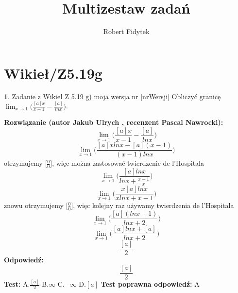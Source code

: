 \documentclass[12pt, a4paper]{article}
\title{Multizestaw zadań}
\author{Robert Fidytek}
\date{}
\theoremstyle{definition} %
\newtheorem{zad}{}
\newcommand{\kategoria}[1]{\section{#1}} %
\newcommand{\zadStart}[1]{\begin{zad}#1\newline} %
\newcommand{\zadStop}{\end{zad}}   %
\newcommand{\rozwStart}[2]{\noindent \textbf{Rozwiązanie (autor #1 , recenzent #2): }\newline} %
\newcommand{\rozwStop}{\newline}                                            %
\newcommand{\odpStart}{\noindent \textbf{Odpowiedź:}\newline}    %
\newcommand{\odpStop}{\newline}                                             %
\newcommand{\testStart}{\noindent \textbf{Test:}\newline} %
\newcommand{\testStop}{\newline} %
\newcommand{\kluczStart}{\noindent \textbf{Test poprawna odpowiedź:}\newline} %
\newcommand{\kluczStop}{\newline} %
\begin{document}
\maketitle


\kategoria{Wikieł/Z5.19g}
\zadStart{Zadanie z Wikieł Z 5.19 g) moja wersja nr [nrWersji]}
Obliczyć granicę $\lim_{x \to 1}\big(\frac{[a]x}{x-1}-\frac{[a]}{lnx}\big)$.
\zadStop
\rozwStart{Jakub Ulrych}{Pascal Nawrocki}
$$\lim_{x \to 1}\big(\frac{[a]x}{x-1}-\frac{[a]}{lnx}\big)$$
$$\lim_{x \to 1}\big(\frac{[a]xlnx-[a](x-1)}{(x-1)lnx}\big)$$
otrzymujemy $\big[\frac{0}{0}\big]$, więc można zastosować twierdzenie de l'Hospitala
$$\lim_{x \to 1}\big(\frac{[a]lnx}{lnx+\frac{x-1}{x}}\big)$$
$$\lim_{x \to 1}\big(\frac{x[a]lnx}{xlnx+x-1}\big)$$
znowu otrzymujemy $\big[\frac{0}{0}\big]$, więc kolejny raz używamy twierdzenia de l'Hospitala
$$\lim_{x \to 1}\big(\frac{[a](lnx+1)}{lnx+2}\big)$$
$$\lim_{x \to 1}\big(\frac{[a]lnx+[a]}{lnx+2}\big)$$
$$\frac{[a]}{2}$$
\rozwStop
\odpStart
$$\frac{[a]}{2}$$
\odpStop
\testStart
A.$\frac{[a]}{2}$
B.$\infty$
C.$-\infty$
D.$[a]$
\testStop
\kluczStart
A
\kluczStop
\end{document}
